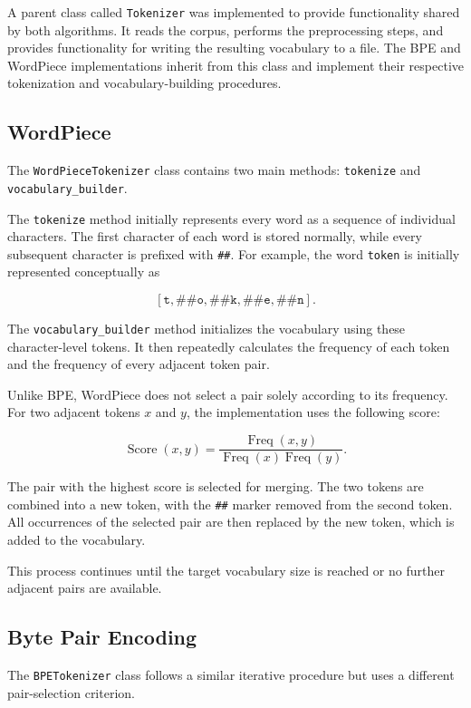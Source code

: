\documentclass[sigconf]{acmart}
\begin{document}
A parent class called \texttt{Tokenizer} was implemented to provide
functionality shared by both algorithms. It reads the corpus, performs
the preprocessing steps, and provides functionality for writing the
resulting vocabulary to a file. The BPE and WordPiece implementations
inherit from this class and implement their respective tokenization and
vocabulary-building procedures.

\subsection{WordPiece}

The \texttt{WordPieceTokenizer} class contains two main methods:
\texttt{tokenize} and \texttt{vocabulary\_builder}.

The \texttt{tokenize} method initially represents every word as a
sequence of individual characters. The first character of each word is
stored normally, while every subsequent character is prefixed with
\texttt{\#\#}. For example, the word \texttt{token} is initially
represented conceptually as

\[
[\texttt{t},\texttt{\#\#o},\texttt{\#\#k},\texttt{\#\#e},
\texttt{\#\#n}].
\]

The \texttt{vocabulary\_builder} method initializes the vocabulary using
these character-level tokens. It then repeatedly calculates the
frequency of each token and the frequency of every adjacent token pair.

Unlike BPE, WordPiece does not select a pair solely according to its
frequency. For two adjacent tokens \(x\) and \(y\), the implementation
uses the following score:

\[
\operatorname{Score}(x,y)
=
\frac{\operatorname{Freq}(x,y)}
{\operatorname{Freq}(x)\operatorname{Freq}(y)}.
\]

The pair with the highest score is selected for merging. The two tokens
are combined into a new token, with the \texttt{\#\#} marker removed
from the second token. All occurrences of the selected pair are then
replaced by the new token, which is added to the vocabulary.

This process continues until the target vocabulary size is reached or
no further adjacent pairs are available.

\subsection{Byte Pair Encoding}

The \texttt{BPETokenizer} class follows a similar iterative procedure
but uses a different pair-selection criterion.
\end{document}
